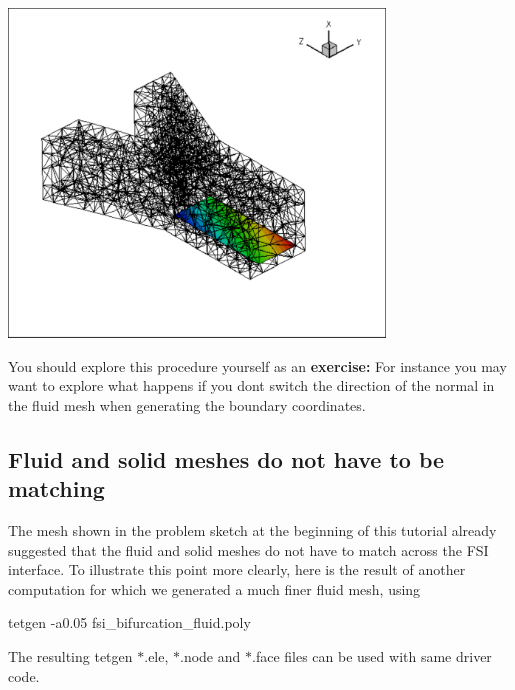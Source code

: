  
\begin{DoxyImage}
\includegraphics[width=0.75\textwidth]{solid_boundary_test}
\end{DoxyImage}


You should explore this procedure yourself as an {\bfseries exercise\+:} For instance you may want to explore what happens if you don\textquotesingle{}t switch the direction of the normal in the fluid mesh when generating the boundary coordinates.



\hypertarget{index_matching_fluid_and_solid}{}\subsection{Fluid and solid meshes do not have to be matching}\label{index_matching_fluid_and_solid}
The mesh shown in the problem sketch at the beginning of this tutorial already suggested that the fluid and solid meshes do not have to match across the F\+SI interface. To illustrate this point more clearly, here is the result of another computation for which we generated a much finer fluid mesh, using


\begin{DoxyCode}
tetgen -a0.05 fsi\_bifurcation\_fluid.poly
\end{DoxyCode}


The resulting tetgen {\ttfamily $\ast$.ele}, {\ttfamily $\ast$.node} and {\ttfamily $\ast$.face} files can be used with same driver code.

